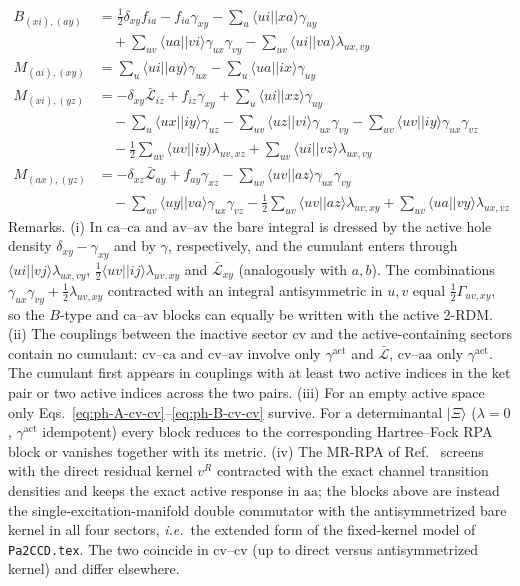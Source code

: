 \documentclass[aip,jcp,reprint,noshowkeys,superscriptaddress]{revtex4-1}
\newcommand{\ie}{\textit{i.e.}}
\newcommand{\sLag}{\bar{\mathcal L}}
\newcommand{\act}{\mathrm{act}}
\newcommand{\scv}{\text{cv}}
\newcommand{\sca}{\text{ca}}
\newcommand{\sav}{\text{av}}
\newcommand{\saa}{\text{aa}}
\begin{document}
\begin{align}
  B_{(xi),(ay)} &= \tfrac{1}{2}\delta_{xy}f_{ia} -f_{ia}\gamma_{xy} -\sum_{u}\langle ui||xa\rangle\gamma_{uy} \nonumber\\
  &\quad +\sum_{uv}\langle ua||vi\rangle\gamma_{ux}\gamma_{vy} -\sum_{uv}\langle ui||va\rangle\lambda_{ux,vy}
  \label{eq:ph-B-ca-av}\\
  M_{(ai),(xy)} &= \sum_{u}\langle ui||ay\rangle\gamma_{ux} -\sum_{u}\langle ua||ix\rangle\gamma_{uy}
  \label{eq:ph-A-cv-aa}\\
  M_{(xi),(yz)} &= -\delta_{xy}\bar{\mathcal L}_{iz} +f_{iz}\gamma_{xy} +\sum_{u}\langle ui||xz\rangle\gamma_{uy} \nonumber\\
  &\quad -\sum_{u}\langle ux||iy\rangle\gamma_{uz} -\sum_{uv}\langle uz||vi\rangle\gamma_{ux}\gamma_{vy} -\sum_{uv}\langle uv||iy\rangle\gamma_{ux}\gamma_{vz} \nonumber\\
  &\quad -\tfrac{1}{2}\sum_{uv}\langle uv||iy\rangle\lambda_{uv,xz} +\sum_{uv}\langle ui||vz\rangle\lambda_{ux,vy}
  \label{eq:ph-A-ca-aa}\\
  M_{(ax),(yz)} &= -\delta_{xz}\bar{\mathcal L}_{ay} +f_{ay}\gamma_{xz} -\sum_{uv}\langle uv||az\rangle\gamma_{ux}\gamma_{vy} \nonumber\\
  &\quad -\sum_{uv}\langle uy||va\rangle\gamma_{ux}\gamma_{vz} -\tfrac{1}{2}\sum_{uv}\langle uv||az\rangle\lambda_{uv,xy} +\sum_{uv}\langle ua||vy\rangle\lambda_{ux,vz}
  \label{eq:ph-A-av-aa}
\end{align}
Remarks.  (i) In $\sca$--$\sca$ and $\sav$--$\sav$ the bare integral is dressed
by the active hole density $\delta_{xy}-\gamma_{xy}$ and by $\gamma$,
respectively, and the cumulant enters through
$\langle ui||vj\rangle\lambda_{ux,vy}$, $\tfrac12\langle uv||ij\rangle\lambda_{uv,xy}$
and $\sLag_{xy}$ (analogously with $a,b$).  The combinations
$\gamma_{ux}\gamma_{vy}+\tfrac12\lambda_{uv,xy}$ contracted with an integral
antisymmetric in $u,v$ equal $\tfrac12\Gamma_{uv,xy}$, so the $B$-type and
$\sca$--$\sav$ blocks can equally be written with the active 2-RDM.
(ii) The couplings between the inactive sector $\scv$ and the active-containing
sectors contain no cumulant: $\scv$--$\sca$ and $\scv$--$\sav$ involve only
$\gamma^{\act}$ and $\sLag$, $\scv$--$\saa$ only $\gamma^{\act}$.  The cumulant
first appears in couplings with at least two active indices in the ket pair or
two active indices across the two pairs.  (iii) For an empty active space only
Eqs.~\eqref{eq:ph-A-cv-cv}--\eqref{eq:ph-B-cv-cv} survive.  For a
determinantal $|\Xi\rangle$ ($\lambda=0$, $\gamma^{\act}$ idempotent) every
block reduces to the corresponding Hartree--Fock RPA block or vanishes together
with its metric.  (iv) The MR-RPA of Ref.~\cite{WangFangLi2026} screens with
the direct residual kernel $v^R$ contracted with the exact channel transition
densities and keeps the exact active response in $\saa$; the blocks above are
instead the single-excitation-manifold double commutator with the
antisymmetrized bare kernel in all four sectors, \ie\ the extended form of the
fixed-kernel model of \texttt{Pa2CCD.tex}.  The two coincide in
$\scv$--$\scv$ (up to direct versus antisymmetrized kernel) and differ elsewhere.
\end{document}
